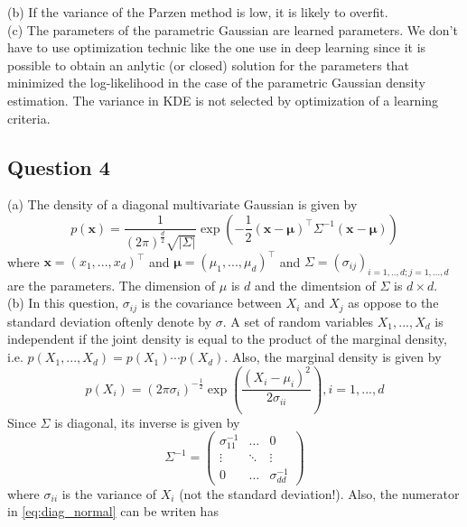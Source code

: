 \documentclass[12pt,english]{amsart}
\theoremstyle{definition}
\begin{document}
(b) If the variance of the Parzen method is low, it is likely to overfit.\\

(c) The parameters of the parametric Gaussian are learned parameters. We don't have to use optimization technic like the one use in deep learning since it is possible to obtain an anlytic (or closed) solution for the parameters that minimized the log-likelihood in the case of the parametric Gaussian density estimation. The variance in KDE is not selected by optimization of a learning criteria.

\subsection*{Question 4}
(a) The density of a diagonal multivariate Gaussian is given by
\begin{equation}
p(\bm{x}) 
= \frac{1}{(2\pi)^\frac{d}{2}\sqrt{|\Sigma|}}
\exp\left(
   - \frac{1}{2}(\bm{x}-\bm{\mu})^\top\Sigma^{-1}(\bm{x}-\bm{\mu})
\right)
\label{eq:diag_normal}
\end{equation}
where $\bm{x}=(x_1,...,x_d)^\top $ and $\bm{\mu}=(\mu_1,...,\mu_d)^\top$ and $\Sigma=\left(\sigma_{ij}\right)_{i=1,..,d; j=1,...,d}$ are the parameters. The dimension of $\mu$ is $d$ and the dimentsion of $\Sigma$ is $d\times d$.\\

(b) In this question, $\sigma_{ij}$ is the covariance between $X_i$ and $X_j$ as oppose to the standard deviation oftenly denote by $\sigma$. A set of random variables $X_1,...,X_d$ is independent if the joint density is equal to the product of the marginal density, i.e. $p(X_1,...,X_d)=p(X_1)\cdots p(X_d)$. Also, the marginal density is given by
$$
    p(X_i) = (2\pi\sigma_i)^{-\frac{1}{2}} 
    \exp
    \left(
        \frac{(X_i-\mu_i)^2}{2\sigma_{ii}}
    \right),
    i=1,...,d
$$
Since $\Sigma$ is diagonal, its inverse is given by 
$$
    \Sigma^{-1} = 
    \begin{pmatrix}
        \sigma_{11}^{-1} & \hdots & 0 \\
        \vdots & \ddots & \vdots \\
        0 & \hdots & \sigma_{dd}^{-1}
    \end{pmatrix}
$$
where $\sigma_{ii}$ is the variance of $X_i$ (not the standard deviation!).
Also, the numerator in \ref{eq:diag_normal} can be writen has
\end{document}
